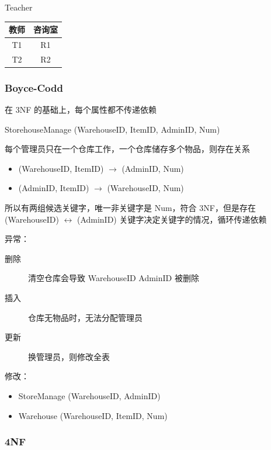 \documentclass[11pt,journal,compsoc]{IEEEtran}
\begin{document}
Teacher

\begin{table}[H]
    \centering
    \begin{tabular}{|c|c|}
        \hline
        教师 & 咨询室 \\
        \hline
        T1 & R1 \\
        T2 & R2 \\
        \hline
    \end{tabular}
\end{table}


\subsubsection{Boyce-Codd}

在 3NF 的基础上，每个属性都不传递依赖

StorehouseManage (WarehouseID, ItemID, AdminID, Num)

每个管理员只在一个仓库工作，一个仓库储存多个物品，则存在关系

\begin{itemize}
    \item (WarehouseID, ItemID) $\to$ (AdminID, Num)

    \item (AdminID, ItemID) $\to$ (WarehouseID, Num)
\end{itemize}

所以有两组候选关键字，唯一非关键字是 Num，符合 3NF，但是存在 (WarehouseID) $\leftrightarrow$ (AdminID) 关键字决定关键字的情况，循环传递依赖

异常：

\begin{description}
    \item[删除] 清空仓库会导致 WarehouseID AdminID 被删除

    \item[插入] 仓库无物品时，无法分配管理员

    \item[更新] 换管理员，则修改全表
\end{description}

修改：

\begin{itemize}
    \item StoreManage (WarehouseID, AdminID)

    \item Warehouse (WarehouseID, ItemID, Num)
\end{itemize}


\subsubsection{4NF}
\end{document}
